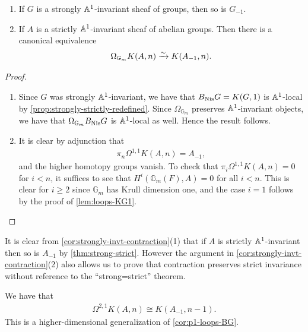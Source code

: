 \documentclass[11pt,openany]{book}
\begin{document}
\begin{corollary}\label{cor:strongly-invt-contraction} 
\begin{enumerate}
    \item If $G$ is a strongly $\mathbb{A}^1$-invariant sheaf of groups, then so is $G_{-1}$.
    \item If $A$ is a strictly $\mathbb{A}^1$-invariant sheaf of abelian groups. Then there is a canonical equivalence
    \begin{align*}
        \Omega_{\mathbb{G}_m} K(A,n) \xrightarrow{\sim} K(A_{-1},n).
    \end{align*}
\end{enumerate}
\end{corollary}
\begin{proof} $\ $
\begin{enumerate}
    \item Since $G$ was strongly $\mathbb{A}^1$-invariant, we have that $B_{\mathrm{Nis}} G = K(G,1)$ is $\mathbb{A}^1$-local by \autoref{prop:strongly-strictly-redefined}. Since $\Omega_{\mathbb{G}_m}$ preserves $\mathbb{A}^1$-invariant objects, we have that $\Omega_{\mathbb{G}_m}B_{\mathrm{Nis}} G$ is $\mathbb{A}^1$-local as well. Hence the result follows.
    \item It is clear by adjunction that
    \begin{align*}
        \pi_n \Omega^{1,1}K(A,n) = A_{-1},
    \end{align*}
    and the higher homotopy groups vanish. To check that $\pi_i \Omega^{1,1} K(A,n) = 0$ for $i<n$, it suffices to see that $H^i(\mathbb{G}_m(F), A) = 0$ for all $i<n$. This is clear for $i\ge 2$ since $\mathbb{G}_m$ has Krull dimension one, and the case $i=1$ follows by the proof of \autoref{lem:loops-KG1}.
\end{enumerate}
\end{proof}

\begin{remark} 
It is clear from \autoref{cor:strongly-invt-contraction}(1) that if $A$ is strictly $\mathbb{A}^1$-invariant then so is $A_{-1}$ by \autoref{thm:strong-strict}. However the argument in \autoref{cor:strongly-invt-contraction}(2) also allows us to prove that contraction preserves strict invariance without reference to the ``strong=strict'' theorem.
\end{remark}



\begin{corollary} We have that
\begin{align*}
    \Omega^{2,1} K(A,n) \cong K(A_{-1},n-1).
\end{align*}
This is a higher-dimensional generalization of \autoref{cor:p1-loops-BG}.
\end{corollary}
\end{document}
